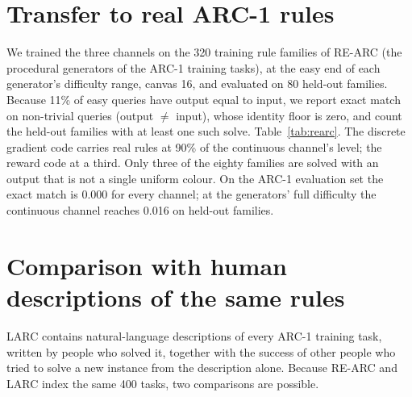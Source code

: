 \documentclass[11pt]{article}
\begin{document}
\section{Transfer to real ARC-1 rules}
We trained the three channels on the 320 training rule families of RE-ARC (the procedural generators of
the ARC-1 training tasks), at the easy end of each generator's difficulty range, canvas 16, and
evaluated on 80 held-out families. Because 11\% of easy queries have output equal to input, we report
exact match on non-trivial queries (output $\neq$ input), whose identity floor is zero, and count the
held-out families with at least one such solve. Table~\ref{tab:rearc}. The discrete gradient code
carries real rules at 90\% of the continuous channel's level; the reward code at a third. Only three
of the eighty families are solved with an output that is not a single uniform colour. On the ARC-1
evaluation set the exact match is 0.000 for every channel; at the generators' full difficulty the
continuous channel reaches 0.016 on held-out families.

\begin{table}[h]\centering\small
{}
\caption{Transfer to held-out ARC-1 rule families (RE-ARC, easy difficulty, 20\,000 steps).}\label{tab:rearc}
\end{table}

\section{Comparison with human descriptions of the same rules}
LARC \citep{acquaviva2022} contains natural-language descriptions of every ARC-1 training task, written
by people who solved it, together with the success of other people who tried to solve a new instance
from the description alone. Because RE-ARC and LARC index the same 400 tasks, two comparisons are
possible.
\end{document}
